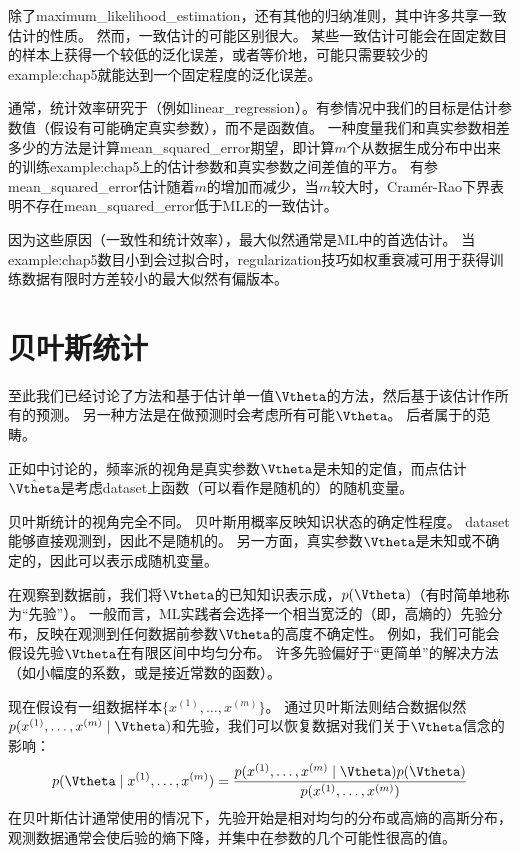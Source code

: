 除了\gls{maximum_likelihood_estimation}，还有其他的归纳准则，其中许多共享一致估计的性质。
然而，一致估计的可能区别很大。
某些一致估计可能会在固定数目的样本上获得一个较低的泛化误差，或者等价地，可能只需要较少的\gls{example:chap5}就能达到一个固定程度的泛化误差。

通常，统计效率研究于（例如\gls{linear_regression}）。有参情况中我们的目标是估计参数值（假设有可能确定真实参数），而不是函数值。
一种度量我们和真实参数相差多少的方法是计算\gls{mean_squared_error}期望，即计算$m$个从数据生成分布中出来的训练\gls{example:chap5}上的估计参数和真实参数之间差值的平方。
有参\gls{mean_squared_error}估计随着$m$的增加而减少，当$m$较大时，Cram\'er-Rao下界\citep{Rao-1945,Cramer-1946}表明不存在\gls{mean_squared_error}低于\gls{MLE}的一致估计。

因为这些原因（一致性和统计效率），最大似然通常是\gls{ML}中的首选估计。
当\gls{example:chap5}数目小到会过拟合时，\gls{regularization}技巧如权重衰减可用于获得训练数据有限时方差较小的最大似然有偏版本。


\section{贝叶斯统计}
\label{sec:bayesian_statistics}
至此我们已经讨论了方法和基于估计单一值$\Vtheta$的方法，然后基于该估计作所有的预测。
另一种方法是在做预测时会考虑所有可能$\Vtheta$。
后者属于的范畴。

正如中讨论的，频率派的视角是真实参数$\Vtheta$是未知的定值，而点估计$\hat{\Vtheta}$是考虑\gls{dataset}上函数（可以看作是随机的）的随机变量。

贝叶斯统计的视角完全不同。
贝叶斯用概率反映知识状态的确定性程度。
\gls{dataset}能够直接观测到，因此不是随机的。
另一方面，真实参数$\Vtheta$是未知或不确定的，因此可以表示成随机变量。

在观察到数据前，我们将$\Vtheta$的已知知识表示成，$p(\Vtheta)$（有时简单地称为``先验''）。
一般而言，\gls{ML}实践者会选择一个相当宽泛的（即，高熵的）先验分布，反映在观测到任何数据前参数$\Vtheta$的高度不确定性。
例如，我们可能会假设先验$\Vtheta$在有限区间中均匀分布。
许多先验偏好于``更简单''的解决方法（如小幅度的系数，或是接近常数的函数）。

现在假设有一组数据样本$\{x^{(1)},\dots,x^{(m)}\}$。
通过贝叶斯法则结合数据似然$p(x^{(1)},\dots,x^{(m)} \mid \Vtheta)$和先验，我们可以恢复数据对我们关于$\Vtheta$信念的影响：
\begin{equation}
        p(\Vtheta \mid x^{(1)},\dots,x^{(m)}) = 
        \frac{p(x^{(1)},\dots,x^{(m)} \mid \Vtheta) p(\Vtheta)}
            {p(x^{(1)},\dots,x^{(m)})}
\end{equation}
在贝叶斯估计通常使用的情况下，先验开始是相对均匀的分布或高熵的高斯分布，观测数据通常会使后验的熵下降，并集中在参数的几个可能性很高的值。

